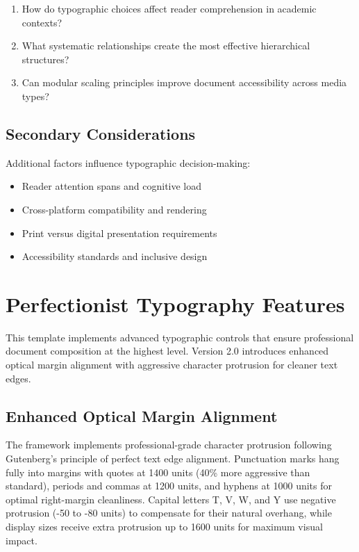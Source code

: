 \documentclass[11pt]{article}
\begin{document}
\begin{enumerate}
\item How do typographic choices affect reader comprehension in academic contexts?
\item What systematic relationships create the most effective hierarchical structures?
\item Can modular scaling principles improve document accessibility across media types?
\end{enumerate}

\subsection{Secondary Considerations}

Additional factors influence typographic decision-making:

\begin{itemize}
\item Reader attention spans and cognitive load
\item Cross-platform compatibility and rendering
\item Print versus digital presentation requirements
\item Accessibility standards and inclusive design
\end{itemize}

\section{Perfectionist Typography Features}

This template implements advanced typographic controls that ensure professional document composition at the highest level. Version 2.0 introduces enhanced optical margin alignment with aggressive character protrusion for cleaner text edges.

\subsection{Enhanced Optical Margin Alignment}

The framework implements professional-grade character protrusion following Gutenberg's principle of perfect text edge alignment. Punctuation marks hang fully into margins with quotes at 1400 units (40\% more aggressive than standard), periods and commas at 1200 units, and hyphens at 1000 units for optimal right-margin cleanliness. Capital letters T, V, W, and Y use negative protrusion (-50 to -80 units) to compensate for their natural overhang, while display sizes receive extra protrusion up to 1600 units for maximum visual impact.
\end{document}
